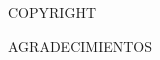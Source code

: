 \documentclass{article}
\begin{document}
\begin{titlepage}\thispagestyle{empty}
{\scshape\Huge COPYRIGHT \par}
\end{titlepage}
\newpage\phantom{blabla}\thispagestyle{empty}
\begin{titlepage}\thispagestyle{empty}
{\scshape\Huge AGRADECIMIENTOS \par}
\end{titlepage}
\newpage\phantom{blabla}\thispagestyle{empty}
\end{document}
